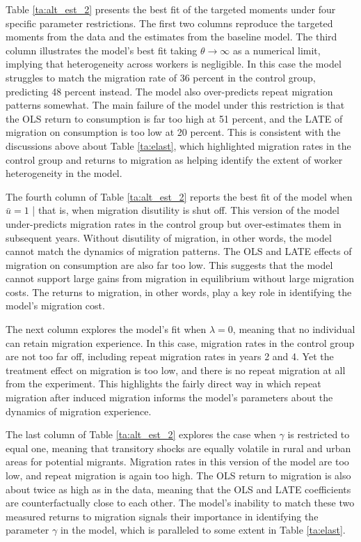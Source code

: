 \documentclass[12pt,pdftex]{article}
\begin{document}
Table \ref{ta:alt_est_2} presents the best fit of the targeted moments under four specific parameter restrictions. The first two columns reproduce the targeted moments from the data and the estimates from the baseline model. The third column illustrates the model's best fit taking $\theta \rightarrow \infty$ as a numerical limit, implying that heterogeneity across workers is negligible. In this case the model struggles to match the migration rate of 36 percent in the control group, predicting 48 percent instead. The model also over-predicts repeat migration patterns somewhat. The main failure of the model under this restriction is that the OLS return to consumption is far too high at 51 percent, and the LATE of migration on consumption is too low at 20 percent. This is consistent with the discussions above about Table \ref{ta:elast}, which highlighted migration rates in the control group and returns to migration as helping identify the extent of worker heterogeneity in the model.

The fourth column of Table \ref{ta:alt_est_2} reports the best fit of the model when $\bar u = 1$ | that is, when migration disutility is shut off. This version of the model under-predicts migration rates in the control group but over-estimates them in subsequent years. Without disutility of migration, in other words, the model cannot match the dynamics of migration patterns. The OLS and LATE effects of migration on consumption are also far too low. This suggests that the model cannot support large gains from migration in equilibrium without large migration costs. The returns to migration, in other words, play a key role in identifying the model's migration cost.

The next column explores the model's fit when $\lambda = 0$, meaning that no individual can retain migration experience. In this case, migration rates in the control group are not too far off, including repeat migration rates in years 2 and 4. Yet the treatment effect on migration is too low, and there is no repeat migration at all from the experiment. This highlights the fairly direct way in which repeat migration after induced migration informs the model's parameters about the dynamics of migration experience.

The last column of Table \ref{ta:alt_est_2} explores the case when $\gamma$ is restricted to equal one, meaning that transitory shocks are equally volatile in rural and urban areas for potential migrants. Migration rates in this version of the model are too low, and repeat migration is again too high. The OLS return to migration is also about twice as high as in the data, meaning that the OLS and LATE coefficients are counterfactually close to each other. The model's inability to match these two measured returns to migration signals their importance in identifying the parameter $\gamma$ in the model, which is paralleled to some extent in Table \ref{ta:elast}.
\end{document}
